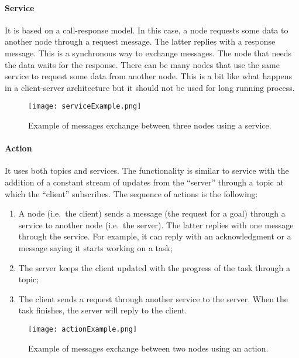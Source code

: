 \documentclass[../thesis.tex]{subfiles}
\begin{document}
\paragraph{Service}
It is based on a call-response model. In this case, a node requests some data to another node through a request message. The latter replies with a response message. This is a synchronous way to exchange messages. The node that needs the data waits for the response. There can be many nodes that use the same service to request some data from another node. This is a bit like what happens in a client-server architecture but it should not be used for long running process.
\begin{figure}[H]
    \centering
    \texttt{[image: serviceExample.png]}
    \caption{Example of messages exchange between three nodes using a service.}
    \label{fig:exampleServiceExchangeMessage}
\end{figure}

\paragraph{Action}
It uses both topics and services. The functionality is similar to service with the addition of a constant stream of updates from the ``server'' through a topic at which the ``client'' subscribes. The sequence of actions is the following:
    \begin{enumerate}
        \item A node (i.e.\ the client) sends a message (the request for a goal) through a service to another node (i.e.\ the server). The latter replies with one message through the service. For example, it can reply with an acknowledgment or a message saying it starts working on a task;
        \item The server keeps the client updated with the progress of the task through a topic;
        \item The client sends a request through another service to the server. When the task finishes, the server will reply to the client.
    \end{enumerate}
\begin{figure}[H]
    \centering
    \texttt{[image: actionExample.png]}
    \caption{Example of messages exchange between two nodes using an action.}
    \label{fig:exampleActionExchangeMessage}
\end{figure}
\end{document}
